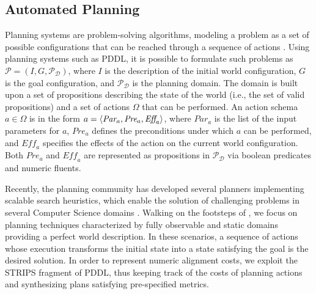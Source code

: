
\subsection{Automated Planning}\label{ssec:ap}
Planning systems are problem-solving algorithms, modeling a problem as a set of possible configurations that can be reached through a sequence of actions \cite{APlan}. Using planning systems such as PDDL, it is possible to formulate such problems as $\mathcal{P}=(I,G,\mathcal{P}_\mathcal
{D})$, where $I$ is the description of the initial world configuration, $G$ is the goal configuration, and $\mathcal{P}_\mathcal{D}$ is the planning domain. The domain is built upon a set of propositions describing the state of the world (i.e., the set of valid propositions) and a set of actions $\Omega$ that can be performed. An action schema $a\in \Omega$ is in the form $a=\Braket{\textit{Par}_a,\textit{Pre}_a,\textit{Eff}_a}$, where $\textit{Par}_a$ is the list of the input parameters for $a$, $\textit{Pre}_a$ defines the preconditions under which $a$ can be performed, and $\textit{Eff}_a$ specifies the effects of the action on the current world configuration. Both $\textit{Pre}_a$ and $\textit{Eff}_a$ are represented as propositions in $\mathcal{P}_\mathcal{D}$ via boolean predicates and numeric fluents.

Recently, the planning community has developed several planners implementing scalable search heuristics, which enable the solution of challenging problems in several Computer Science domains \cite{Marrella17}. Walking on the footsteps of \cite{XuLZ17a}, we focus on planning techniques characterized by fully observable and static domains providing a perfect world description. In these scenarios, a sequence of actions whose execution transforms the initial state into a state satisfying the goal is the desired solution. In order to represent numeric alignment costs, we exploit the STRIPS fragment of PDDL, thus keeping track of the costs of planning actions and synthesizing plans satisfying pre-specified metrics.

